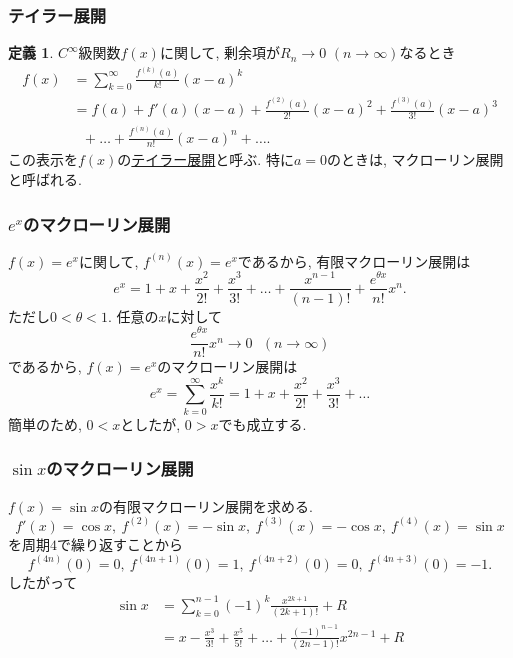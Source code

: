 \documentclass[dvipdfmx,cjk,10.2pt]{beamer}
\theoremstyle{definition}
\newtheorem{Def}[Thm]{定義}
\begin{document}
\begin{frame}
\frametitle{テイラー展開}

\begin{Def}
$C^\infty$級関数$f(x)$に関して, 剰余項が$R_n \to 0$ $(n \rightarrow \infty)$なるとき
\begin{align*}
f(x) & = \sum_{k=0}^{\infty}\frac{f^{(k)}(a)}{k!}(x-a)^k \\
& =  f(a)+ f'(a)(x-a) + \frac{f^{(2)}(a)}{2!}(x-a)^2  + \frac{f^{(3)}(a)}{3!}(x-a)^3 \\
& \ \ \ + \dots + \frac{f^{(n)}(a)}{n!}(x-a)^{n}+\dots. 
\end{align*}
この表示を$f(x)$の\underline{テイラー展開}と呼ぶ. 
特に$a=0$のときは, マクローリン展開と呼ばれる. 
\end{Def}

\end{frame}






\begin{frame}
\frametitle{$e^x$のマクローリン展開}

$f(x)=e^x$に関して, $f^{(n)}(x)=e^x$であるから, 有限マクローリン展開は
$$
e^x=1+x+\frac{x^2}{2!}+\frac{x^3}{3!}+\dots+\frac{x^{n-1}}{(n-1)!}+\frac{e^{\theta x}}{n!}x^n. 
$$
ただし$0<\theta < 1$. 
任意の$x$に対して
$$
\frac{e^{\theta x}}{n!}x^n \to 0 \ \ \ (n \to \infty)
$$
であるから, $f(x)=e^x$のマクローリン展開は
$$
e^x= \sum_{k=0}^{\infty}\frac{x^k}{k!}
=1+x+\frac{x^2}{2!}+\frac{x^3}{3!}+\dots
$$
簡単のため, $0<x$としたが, $0>x$でも成立する.  
\end{frame}






\begin{frame}
\frametitle{$\sin x$のマクローリン展開}

$f(x)=\sin x$の有限マクローリン展開を求める. 
$$
f'(x)=\cos x, \ f^{(2)}(x)=-\sin x, \ f^{(3)}(x)=-\cos x, \ f^{(4)}(x)=\sin x
$$
を周期$4$で繰り返すことから
$$
 f^{(4n)}(0)=0, \ f^{(4n+1)}(0)=1, \ f^{(4n+2)}(0)=0, \ f^{(4n+3)}(0)=-1. 
$$
したがって
\begin{align*}
\sin x & = \sum_{k=0}^{n-1}(-1)^k\frac{x^{2k+1}}{(2k+1)!}+R \\
& = x-\frac{x^3}{3!}+\frac{x^5}{5!}+\dots+\frac{(-1)^{n-1}}{(2n-1)!}x^{2n-1}+R
\end{align*}
	

\end{frame}
\end{document}
